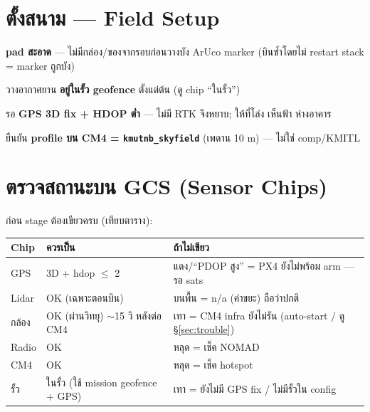 \documentclass[11pt,a4paper]{article}
\newcommand{\code}[1]{\texttt{\small #1}}
\begin{document}
\section{ตั้งสนาม — Field Setup}
\begin{cl}
\item \textbf{pad สะอาด} — ไม่มีกล่อง/ของจากรอบก่อนวางบัง ArUco marker (บินซ้ำโดยไม่ restart stack = marker ถูกบัง)
\item วางอากาศยาน \textbf{อยู่ในรั้ว geofence} ตั้งแต่ต้น (ดู chip ``ในรั้ว'')
\item รอ \textbf{GPS 3D fix + HDOP ต่ำ} — ไม่มี RTK จึงหยาบ; ให้ที่โล่ง เห็นฟ้า ห่างอาคาร
\item ยืนยัน \textbf{profile บน CM4 = \code{kmutnb_skyfield}} (เพดาน 10 m) — ไม่ใช่ comp/KMITL
\end{cl}

\section{ตรวจสถานะบน GCS (Sensor Chips)}
ก่อน stage ต้องเขียวครบ (เทียบตาราง):

\begin{tabular}{@{}>{\raggedright\arraybackslash}p{2.3cm} >{\raggedright\arraybackslash}p{6.2cm} >{\raggedright\arraybackslash}p{8.0cm}@{}}
\toprule
\textbf{Chip} & \textbf{ควรเป็น} & \textbf{ถ้าไม่เขียว} \\
\midrule
GPS & \textcolor{grn}{3D + hdop $\leq$ 2} & แดง/``PDOP สูง'' = PX4 ยังไม่พร้อม arm — รอ sats \\
Lidar & \textcolor{grn}{OK} (เฉพาะตอนบิน) & บนพื้น = n/a (ค่าขยะ) ถือว่าปกติ \\
กล้อง & \textcolor{grn}{OK} (ผ่านวิทยุ) $\sim$15 วิ หลังต่อ CM4 & เทา = CM4 infra ยังไม่รัน (auto-start / ดู §\ref{sec:trouble}) \\
Radio & \textcolor{grn}{OK} & หลุด = เช็ค NOMAD \\
CM4 & \textcolor{grn}{OK} & หลุด = เช็ค hotspot \\
รั้ว & \textcolor{grn}{ในรั้ว} (ใช้ mission geofence + GPS) & เทา = ยังไม่มี GPS fix / ไม่มีรั้วใน config \\
\bottomrule
\end{tabular}

\end{document}

